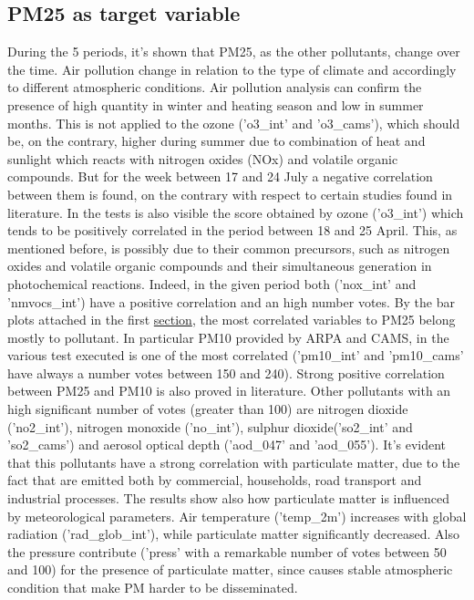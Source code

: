 \subsection{PM25 as target variable}
During the 5 periods, it's shown that PM25, as the other pollutants, change over the time. Air pollution change in relation to the type of climate and accordingly to different atmospheric conditions.
Air pollution analysis can confirm the presence of high quantity in winter and heating season and low in summer months\cite{cichowicz2017dispersion}. This is not applied to the ozone ('o3\_int' and 'o3\_cams'), which should be, on the contrary, higher during summer due to combination of heat and sunlight which reacts with nitrogen oxides (NOx) and volatile organic compounds. But for the week between 17 and 24 July a negative correlation between them is found, on the contrary with respect to certain studies found in literature\cite{zhu2019correlations}\cite{biglari2017relationship}.
In the tests is also visible the score obtained by ozone ('o3\_int') which tends to be positively correlated in the period between 18 and 25 April.
This, as mentioned before, is possibly due to their common precursors, such as nitrogen oxides and volatile organic compounds and their simultaneous generation in photochemical reactions. Indeed, in the given period both ('nox\_int' and 'nmvocs\_int') have a positive correlation and an high number votes.
By the bar plots attached in the first \hyperref[sec:pm25]{section}, the most correlated variables to PM25 belong mostly to pollutant. In particular PM10 provided by ARPA and CAMS, in the various test executed is one of the most correlated ('pm10\_int' and 'pm10\_cams' have always a number votes between 150 and 240). Strong positive correlation between PM25 and PM10 is also proved in literature\cite{zhou2016concentrations}. 
Other pollutants with an high significant number of votes (greater than 100) are nitrogen dioxide ('no2\_int'), nitrogen monoxide ('no\_int'), sulphur dioxide('so2\_int' and 'so2\_cams') and aerosol optical depth ('aod\_047' and 'aod\_055'). It's evident that this pollutants have a strong correlation with particulate matter, due to the fact that are emitted both by commercial, households, road transport and industrial processes\cite{maranzano2022air}.
The results show also how particulate matter is influenced by meteorological parameters.
Air temperature ('temp\_2m') increases with global radiation ('rad\_glob\_int'), while particulate matter significantly decreased\cite{li2015particulate}. 
Also the pressure contribute ('press' with a remarkable number of votes between 50 and 100) for the presence of particulate matter, since causes stable atmospheric condition that make PM harder to be disseminated. 
